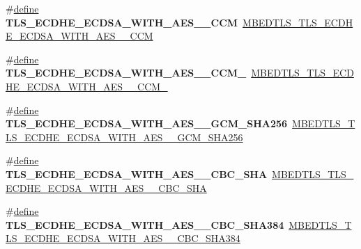 \begin{DoxyCompactItemize}
\item 
\mbox{\label{compat-1_83_8h_a487efc0ff5a09743878ca5c52896b325}} 
\#\hyperlink{structdefine}{define} {\bfseries T\+L\+S\+\_\+\+E\+C\+D\+H\+E\+\_\+\+E\+C\+D\+S\+A\+\_\+\+W\+I\+T\+H\+\_\+\+A\+E\+S\+\_\+\_\+\+C\+CM}~\hyperlink{ssl__ciphersuites_8h_a0c16b21dabaf2bad2c925ba32b8a0241}{M\+B\+E\+D\+T\+L\+S\+\_\+\+T\+L\+S\+\_\+\+E\+C\+D\+H\+E\+\_\+\+E\+C\+D\+S\+A\+\_\+\+W\+I\+T\+H\+\_\+\+A\+E\+S\+\_\+\_\+\+C\+CM}
\item 
\mbox{\label{compat-1_83_8h_a5831ef2a636580afc137f3132e7233e9}} 
\#\hyperlink{structdefine}{define} {\bfseries T\+L\+S\+\_\+\+E\+C\+D\+H\+E\+\_\+\+E\+C\+D\+S\+A\+\_\+\+W\+I\+T\+H\+\_\+\+A\+E\+S\+\_\+\_\+\+C\+C\+M\+\_}~\hyperlink{ssl__ciphersuites_8h_afd212c1204b13e30fcffb1e5800a293f}{M\+B\+E\+D\+T\+L\+S\+\_\+\+T\+L\+S\+\_\+\+E\+C\+D\+H\+E\+\_\+\+E\+C\+D\+S\+A\+\_\+\+W\+I\+T\+H\+\_\+\+A\+E\+S\+\_\+\_\+\+C\+C\+M\+\_}
\item 
\mbox{\label{compat-1_83_8h_a3d7ef0a6518f1f638f2348d99eefb17a}} 
\#\hyperlink{structdefine}{define} {\bfseries T\+L\+S\+\_\+\+E\+C\+D\+H\+E\+\_\+\+E\+C\+D\+S\+A\+\_\+\+W\+I\+T\+H\+\_\+\+A\+E\+S\+\_\+\_\+\+G\+C\+M\+\_\+\+S\+H\+A256}~\hyperlink{ssl__ciphersuites_8h_a2cedef0e0bfae1a154084add0280e975}{M\+B\+E\+D\+T\+L\+S\+\_\+\+T\+L\+S\+\_\+\+E\+C\+D\+H\+E\+\_\+\+E\+C\+D\+S\+A\+\_\+\+W\+I\+T\+H\+\_\+\+A\+E\+S\+\_\+\_\+\+G\+C\+M\+\_\+\+S\+H\+A256}
\item 
\mbox{\label{compat-1_83_8h_ac5bbbda5d30db5b78213e0a53c41e5f6}} 
\#\hyperlink{structdefine}{define} {\bfseries T\+L\+S\+\_\+\+E\+C\+D\+H\+E\+\_\+\+E\+C\+D\+S\+A\+\_\+\+W\+I\+T\+H\+\_\+\+A\+E\+S\+\_\+\_\+\+C\+B\+C\+\_\+\+S\+HA}~\hyperlink{ssl__ciphersuites_8h_a866e8a6b985204fc3e8111ef506d94b4}{M\+B\+E\+D\+T\+L\+S\+\_\+\+T\+L\+S\+\_\+\+E\+C\+D\+H\+E\+\_\+\+E\+C\+D\+S\+A\+\_\+\+W\+I\+T\+H\+\_\+\+A\+E\+S\+\_\+\_\+\+C\+B\+C\+\_\+\+S\+HA}
\item 
\mbox{\label{compat-1_83_8h_af16b4ac6bd9cc610c408b1be8f7b4d2e}} 
\#\hyperlink{structdefine}{define} {\bfseries T\+L\+S\+\_\+\+E\+C\+D\+H\+E\+\_\+\+E\+C\+D\+S\+A\+\_\+\+W\+I\+T\+H\+\_\+\+A\+E\+S\+\_\+\_\+\+C\+B\+C\+\_\+\+S\+H\+A384}~\hyperlink{ssl__ciphersuites_8h_ac7c8985571929c4a076ac7dae53ac460}{M\+B\+E\+D\+T\+L\+S\+\_\+\+T\+L\+S\+\_\+\+E\+C\+D\+H\+E\+\_\+\+E\+C\+D\+S\+A\+\_\+\+W\+I\+T\+H\+\_\+\+A\+E\+S\+\_\+\_\+\+C\+B\+C\+\_\+\+S\+H\+A384}

\end{DoxyCompactItemize}

